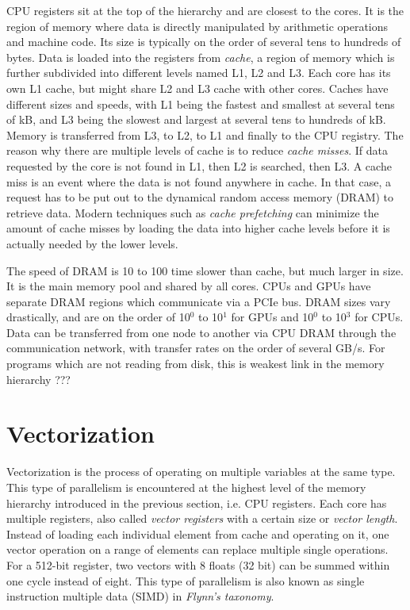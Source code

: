 CPU registers sit at the top of the hierarchy and are closest to the cores. It is the region of memory where data is directly manipulated by arithmetic operations and machine code. Its size is typically on the order of several tens to hundreds of bytes. Data is loaded into the registers from \emph{cache}, a region of memory which is further subdivided into different levels named L1, L2 and L3. Each core has its own L1 cache, but might share L2 and L3 cache with other cores. Caches have different sizes and speeds, with L1 being the fastest and smallest at several tens of kB, and L3 being the slowest and largest at several tens to hundreds of kB. Memory is transferred from L3, to L2, to L1 and finally to the CPU registry. The reason why there are multiple levels of cache is to reduce \emph{cache misses}. If data requested by the core is not found in L1, then L2 is searched, then L3. A cache miss is an event where the data is not found anywhere in cache. In that case, a request has to be put out to the dynamical random access memory (DRAM) to retrieve data. Modern techniques such as \emph{cache prefetching} can minimize the amount of cache misses by loading the data into higher cache levels before it is actually needed by the lower levels. 

The speed of DRAM is 10 to 100 time slower than cache, but much larger in size. It is the main memory pool and shared by all cores. CPUs and GPUs have separate DRAM regions which communicate via a PCIe bus. DRAM sizes vary drastically, and are on the order of 10$^0$ to 10$^1$ for GPUs and 10$^0$ to 10$^3$ for CPUs. Data can be transferred from one node to another via CPU DRAM through the communication network, with transfer rates on the order of several GB/s. For programs which are not reading from disk, this is weakest link in the memory hierarchy ???

\section{Vectorization}

Vectorization is the process of operating on multiple variables at the same type. This type of parallelism is encountered at the highest level of the memory hierarchy introduced in the previous section, i.e. CPU registers. Each core has multiple registers, also called \emph{vector registers} with a certain size or \emph{vector length}. Instead of loading each individual element from cache and operating on it, one vector operation on a range of elements can replace multiple single operations. For a 512-bit register, two vectors with 8 floats (32 bit) can be summed within one cycle instead of eight. This type of parallelism is also known as single instruction multiple data (SIMD) in \emph{Flynn's taxonomy}.

